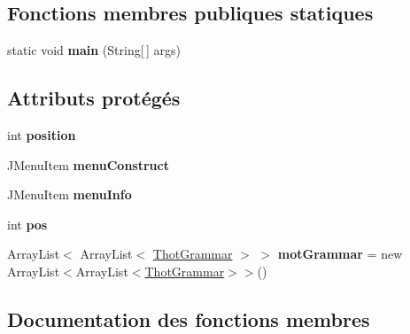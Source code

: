 \subsection*{Fonctions membres publiques statiques}
\begin{DoxyCompactItemize}
\item 
\mbox{\label{classfr_1_1irit_1_1elipse_1_1project_1_1_thot_a760e67dd09b00e0e7575e6f41ce2d4e3}} 
static void {\bfseries main} (String\mbox{[}$\,$\mbox{]} args)
\end{DoxyCompactItemize}
\subsection*{Attributs protégés}
\begin{DoxyCompactItemize}
\item 
\mbox{\label{classfr_1_1irit_1_1elipse_1_1project_1_1_thot_ad86ef2c0a996af2c154070983fc2ccc3}} 
int {\bfseries position}
\item 
\mbox{\label{classfr_1_1irit_1_1elipse_1_1project_1_1_thot_a345f905262ae9959938acde3a99679ca}} 
J\+Menu\+Item {\bfseries menu\+Construct}
\item 
\mbox{\label{classfr_1_1irit_1_1elipse_1_1project_1_1_thot_a23571a40857d000369a403bc30080c9f}} 
J\+Menu\+Item {\bfseries menu\+Info}
\item 
\mbox{\label{classfr_1_1irit_1_1elipse_1_1project_1_1_thot_adacb1e5edfeee025e4bcda4e8e0a1cbd}} 
int {\bfseries pos}
\item 
\mbox{\label{classfr_1_1irit_1_1elipse_1_1project_1_1_thot_a2957a031fbe13d2a900cbf559d24f855}} 
Array\+List$<$ Array\+List$<$ \mbox{\hyperlink{classfr_1_1irit_1_1elipse_1_1project_1_1_thot_grammar}{Thot\+Grammar}} $>$ $>$ {\bfseries mot\+Grammar} = new Array\+List$<$Array\+List$<$\mbox{\hyperlink{classfr_1_1irit_1_1elipse_1_1project_1_1_thot_grammar}{Thot\+Grammar}}$>$$>$()
\end{DoxyCompactItemize}


\subsection{Documentation des fonctions membres}
\mbox{\label{classfr_1_1irit_1_1elipse_1_1project_1_1_thot_a971476b3bfa84ebbde12c591ab7c2763}} 
